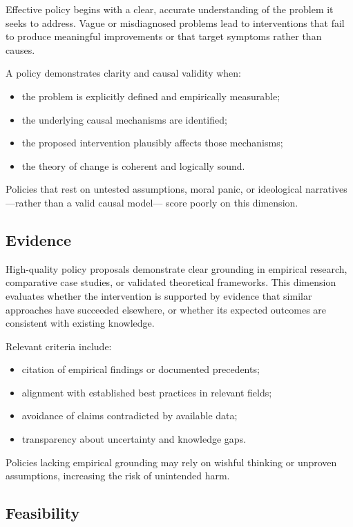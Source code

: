 \documentclass[12pt]{article}
\begin{document}
Effective policy begins with a clear, accurate understanding of the problem it seeks to address. Vague or misdiagnosed
problems lead to interventions that fail to produce meaningful improvements or that target symptoms rather than causes.

A policy demonstrates clarity and causal validity when:
\begin{itemize}
    \item the problem is explicitly defined and empirically measurable;
    \item the underlying causal mechanisms are identified;
    \item the proposed intervention plausibly affects those mechanisms;
    \item the theory of change is coherent and logically sound.
\end{itemize}

Policies that rest on untested assumptions, moral panic, or ideological narratives---rather than a valid causal model---
score poorly on this dimension.

\subsection{Evidence}

High-quality policy proposals demonstrate clear grounding in empirical research, comparative case studies, or validated
theoretical frameworks. This dimension evaluates whether the intervention is supported by evidence that similar approaches
have succeeded elsewhere, or whether its expected outcomes are consistent with existing knowledge.

Relevant criteria include:
\begin{itemize}
    \item citation of empirical findings or documented precedents;
    \item alignment with established best practices in relevant fields;
    \item avoidance of claims contradicted by available data;
    \item transparency about uncertainty and knowledge gaps.
\end{itemize}

Policies lacking empirical grounding may rely on wishful thinking or unproven assumptions, increasing the risk of unintended
harm.

\subsection{Feasibility}
\end{document}
